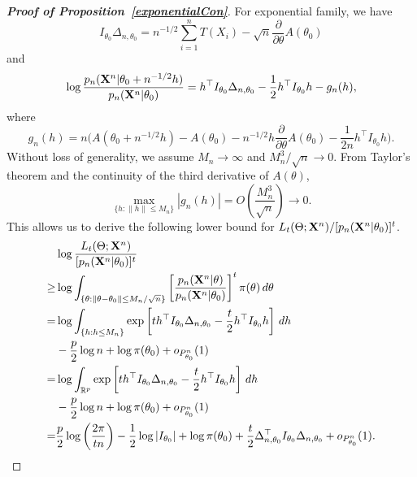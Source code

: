 \documentclass[11pt]{article}
\theoremstyle{plain}
\theoremstyle{definition}
\theoremstyle{remark}
\begin{document}
\begin{appendices}
\begin{proof}[\textbf{Proof of Proposition~\ref{exponentialCon}}]
    For exponential family, we have
    $$
    I_{\theta_0}\Delta_{n,\theta_0}=n^{-1/2}\sum_{i=1}^n T(X_i)-\sqrt{n}\frac{\partial}{\partial \theta} A(\theta_0)
    $$
    and
    $$
    \log\frac{p_n(\mathbf{X}^{n}|\theta_0+n^{-1/2}h)}{p_n(\mathbf{X}^{n}|\theta_0)}
    =h^\top  I_{\theta_0} \Delta_{n,\theta_0}-\frac{1}{2} h^\top  I_{\theta_0} h-
    g_n(h),
    $$
    where
    $$
    g_n(h)=n\Big(A(\theta_0+n^{-1/2}h)-A(\theta_0)-n^{-1/2}h \frac{\partial}{\partial \theta}A(\theta_0)-\frac{1}{2n}h^\top  I_{\theta_0}h\Big).
    $$
    Without loss of generality, we assume $M_n\to \infty$ and $M_n^3/\sqrt{n}\to 0$.
    From Taylor's theorem and the continuity of the third derivative of $A(\theta)$, 
    $$
        \max_{\{h:\|h\|\leq M_n\}}|g_n(h)|=O\left(\frac{M_n^3}{\sqrt{n}}\right)\to 0.
    $$
    This allows us to derive the following lower bound for $L_t(\Theta;\mathbf{X}^{n})/[p_n(\mathbf{X}^{n}|\theta_0)]^t$.
    \begin{equation}\label{yaotou1}
    \begin{split}
&\log \frac{L_t(\Theta;\mathbf{X}^{n})}{[ p_n(\mathbf{X}^{n}|\theta_0)]^t}
    \\
    \geq &
    \log \int_{\{\theta:\|\theta-\theta_0\|\leq M_n/\sqrt{n}\}} \left[\frac{p_n(\mathbf{X}^{n}|\theta)}{p_n(\mathbf{X}^{n}|\theta_0)}\right]^t \pi(\theta)\, d\theta
    \\
    =&
    \log\int_{\{h:h\leq M_n\}} \exp\left[ t h^\top  I_{\theta_0}\Delta_{n,\theta_0}-\frac{t}{2}h^\top  I_{\theta_0}h\right] \, dh
    \\
&-\frac{p}{2}\log n+\log \pi(\theta_0)
    +o_{P_{\theta_0}^n}(1)
    \\
    =&
    \log\int_{\mathbb{R}^p} \exp\left[ t h^\top  I_{\theta_0}\Delta_{n,\theta_0}-\frac{t}{2}h^\top  I_{\theta_0}h\right] \, dh
    \\
&-\frac{p}{2}\log n+\log \pi(\theta_0)
    +o_{P_{\theta_0}^n}(1)
    \\
    =&
        \frac{p}{2}\log\left(\frac{2\pi}{t n}\right)-\frac{1}{2}\log |I_{\theta_0}|
        +\log \pi(\theta_0)
     +
    \frac{t}{2}\Delta_{n,\theta_0}^\top  I_{\theta_0}\Delta_{n,\theta_0}
    +o_{P^n_{\theta_0}}(1).
    \end{split}
\end{equation}


\end{proof}
\end{appendices}
\end{document}
